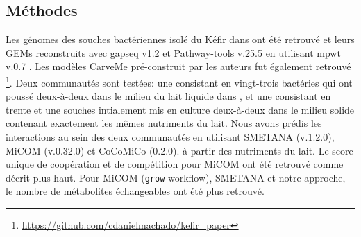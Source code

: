  \subsection{Méthodes} Les génomes des souches bactériennes isolé du Kéfir dans \citep{Blasche.2021} ont été retrouvé et leurs GEMs reconstruits avec gapseq v1.2 \citep{Zimmermann2021} et Pathway-tools v.25.5 \citep{Karp2022} en utilisant mpwt v.0.7 \citep{Belcour.2020}. Les modèles CarveMe \citep{Machado2018} pré-construit par les auteurs fut également retrouvé \footnote{\url{https://github.com/cdanielmachado/kefir\_paper}}. Deux communautés sont testées: une consistant en vingt-trois bactéries qui ont poussé deux-à-deux dans le milieu du lait liquide dans \citep{Blasche.2021}, et une consistant en trente et une souches intialement mis en culture deux-à-deux dans le milieu solide contenant exactement les mêmes nutriments du lait. Nous avons prédis les interactions au sein des deux communautés en utilisant SMETANA (v.1.2.0), MiCOM (v.0.32.0) et CoCoMiCo (0.2.0). à partir des nutriments du lait. Le score unique de coopération et de compétition pour MiCOM ont été retrouvé comme décrit plus haut. Pour MiCOM (\texttt{grow} workflow), SMETANA et notre approche, le nombre de métabolites échangeables ont été plus retrouvé.

